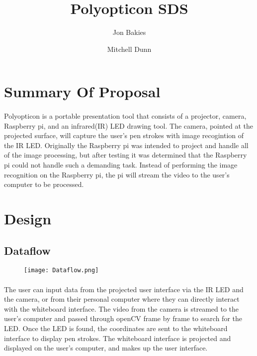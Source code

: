 \documentclass[12pt]{article}
\begin{document}
\title{Polyopticon SDS}
\author{Jon Bakies \and Mitchell Dunn} 

\maketitle
\newpage

\tableofcontents
\newpage

\section{Summary Of Proposal}
\paragraph{}
Polyopticon is a portable presentation tool that consists of a projector, camera, Raspberry pi, and an infrared(IR) LED drawing tool.
The camera, pointed at the projected surface, will capture the user's pen strokes with image recogintion of the IR LED.
Originally the Raspberry pi was intended to project and handle all of the image processing, but after testing it was determined that the Raspberry pi could not handle such a demanding task.
Instead of performing the image recognition on the Raspberry pi, the pi will stream the video to the user's computer to be processed.

\section{Design}
\subsection{Dataflow}
\begin{figure}[ht!]
\centering
\texttt{[image: Dataflow.png]}
\end{figure}
\paragraph{}
The user can input data from the projected user interface via the IR LED and the camera, or from their personal computer where they can directly interact with the whiteboard interface.
The video from the camera is streamed to the user's computer and passed through openCV frame by frame to search for the LED.  
Once the LED is found, the coordinates are sent to the whiteboard interface to display pen strokes.
The whiteboard interface is projected and displayed on the user's computer, and makes up the user interface.
\end{document}
